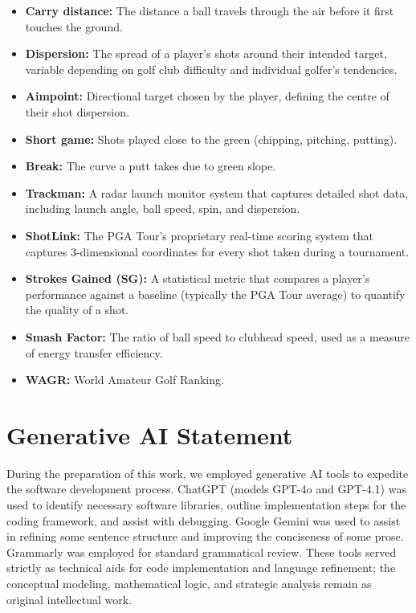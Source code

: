 \documentclass[11pt, letterpaper]{article}
\begin{document}
\begin{itemize}[noitemsep]
    \item \textbf{Carry distance:} The distance a ball travels through the air before it first touches the ground.
    \item \textbf{Dispersion:} The spread of a player’s shots around their intended target, variable depending on golf club difficulty and individual golfer's tendencies.
    \item \textbf{Aimpoint:} Directional target chosen by the player, defining the centre of their shot dispersion.
    \item \textbf{Short game:} Shots played close to the green (chipping, pitching, putting).
    \item \textbf{Break:} The curve a putt takes due to green slope.
    \item \textbf{Trackman:} A radar launch monitor system that captures detailed shot data, including launch angle, ball speed, spin, and dispersion.
    \item \textbf{ShotLink:} The PGA Tour's proprietary real-time scoring system that captures 3-dimensional coordinates for every shot taken during a tournament.
    \item \textbf{Strokes Gained (SG):} A statistical metric that compares a player's performance against a baseline (typically the PGA Tour average) to quantify the quality of a shot.
    \item \textbf{Smash Factor:} The ratio of ball speed to clubhead speed, used as a measure of energy transfer efficiency.
    \item \textbf{WAGR:} World Amateur Golf Ranking.
\end{itemize}











\newpage 



\printbibliography[title={References}]

\vspace{2cm}


\section*{Generative AI Statement}
\noindent
During the preparation of this work, we employed generative AI tools to expedite the software development process. ChatGPT (models GPT-4o and GPT-4.1) was used to identify necessary software libraries, outline implementation steps for the coding framework, and assist with debugging. Google Gemini was used to assist in refining some sentence structure and improving the conciseness of some prose. Grammarly was employed for standard grammatical review. These tools served strictly as technical aids for code implementation and language refinement; the conceptual modeling, mathematical logic, and strategic analysis remain as  original intellectual work.
\end{document}
